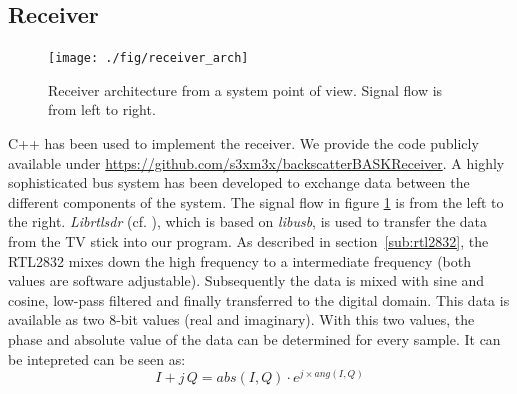 \documentclass[conference]{IEEEtran}
\begin{document}
\subsection{Receiver}
\begin{figure}[h]
\centering
\texttt{[image: ./fig/receiver\_arch]}
\caption{Receiver architecture from a system point of view. Signal flow is from left to right.}
\label{fig:receiver_arch}
\end{figure}
C++ has been used to implement the receiver. We provide the code
publicly available under
\url{https://github.com/s3xm3x/backscatterBASKReceiver}. A highly
sophisticated bus system has been developed to exchange data between the
different components of the system. The signal flow in figure
\ref{fig:receiver_arch} is from the left to the right.
\textit{Librtlsdr} (cf. \cite{steve-m_librtlsdr}), which is based on
\textit{libusb}, is used to transfer the data from the TV stick into our
program. As described in section~\ref{sub:rtl2832}, the RTL2832 mixes
down the high frequency to a intermediate frequency (both values are
software adjustable). Subsequently the data is mixed with sine and
cosine, low-pass filtered and finally transferred to the digital domain.
This data is available as two 8-bit values (real and imaginary). With
this two values, the phase and absolute value of the data can be
determined for every sample. It can be intepreted can be seen as:
\begin{equation}
	I+j\,Q = abs(I,Q) \cdot e^{j \times ang(I,Q)} 
\end{equation} 
 
\end{document}
